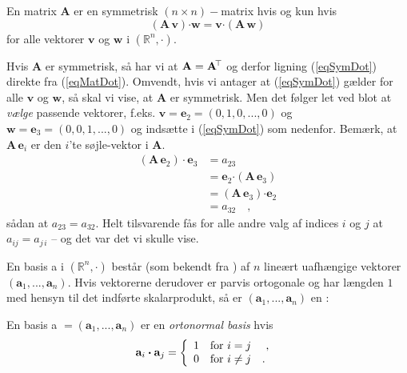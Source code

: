\begin{theorem}
En matrix $\mathbf{A}$ er en symmetrisk $(n \times n)-$matrix hvis og kun hvis
\begin{equation} \label{eqSymDot}
\left(\mathbf{A}\,\mathbf{v} \right){\bm{\cdot}} \mathbf{w} = \mathbf{v} {\bm{\cdot}} \left(\mathbf{A}\,\mathbf{w}\right)
\end{equation}
for alle vektorer $\mathbf{v}$ og $\mathbf{w}$ i $(\mathbb{R}^{n}, \bm{\cdot})$.
\end{theorem}
\begin{bevis}
Hvis $\mathbf{A}$ er symmetrisk, så har vi at $\mathbf{A} = \mathbf{A}\hspace*{-.6mm}^{\top}$ og derfor ligning (\ref{eqSymDot}) direkte fra (\ref{eqMatDot}). Omvendt, hvis vi antager at (\ref{eqSymDot}) gælder for alle $\mathbf{v}$ og $\mathbf{w}$, så skal vi vise, at $\mathbf{A}$ er symmetrisk. Men det følger let ved blot at {\em{vælge}} passende vektorer, f.eks. $\mathbf{v} = \mathbf{e}_{2} = (0, 1, 0, ..., 0)$ og $\mathbf{w} = \mathbf{e}_{3} = (0, 0, 1, ..., 0)$ og indsætte i (\ref{eqSymDot}) som nedenfor. Bemærk, at $\mathbf{A}\,\mathbf{e}_{i}$ er den $i$'te søjle-vektor i $\mathbf{A}$.
\begin{equation}
\begin{aligned}
\left(\mathbf{A}\,\mathbf{e}_{2} \right)\cdot \mathbf{e}_{3} &= a_{23} \\
&= \mathbf{e}_{2} {\bm{\cdot}} \left(\mathbf{A}\,\mathbf{e}_{3}\right) \\
&= \left(\mathbf{A}\,\mathbf{e}_{3}\right){\bm{\cdot}} \mathbf{e}_{2} \\
&= a_{32} \quad,
\end{aligned}
\end{equation}
sådan at $a_{23} = a_{32}$. Helt tilsvarende fås for alle andre valg af indices $i$ og $j$ at $a_{ij}= a_{j\,i}$ -- og det var det vi skulle vise.
\end{bevis}

En basis a i $(\mathbb{R}^{n}, \bm{\cdot})$ består (som bekendt fra ) af $n$ lineært uafhængige vektorer $(\mathbf{a}_{1}, . . . , \mathbf{a}_{n})$. Hvis vektorerne derudover er parvis ortogonale og har længden $1$ med hensyn til det indførte skalarprodukt, så er $(\mathbf{a}_{1}, . . . , \mathbf{a}_{n})$ en  :

\begin{definition} \label{defOrtoBasis}
En basis a $= (\mathbf{a}_{1}, . . . , \mathbf{a}_{n})$ er en {\em{ortonormal basis}} hvis
\begin{equation} \label{eqOrtoBasis}
\mathbf{a}_{i} \bm{\cdot} \mathbf{a}_{j} = \left\{
  \begin{array}{ll}
    1 & \hbox{\textrm{for $i = j$} \quad , } \\
    0 & \hbox{\textrm{for $i \neq  j$}\quad.}
  \end{array}
\right.
\end{equation}
\end{definition}

